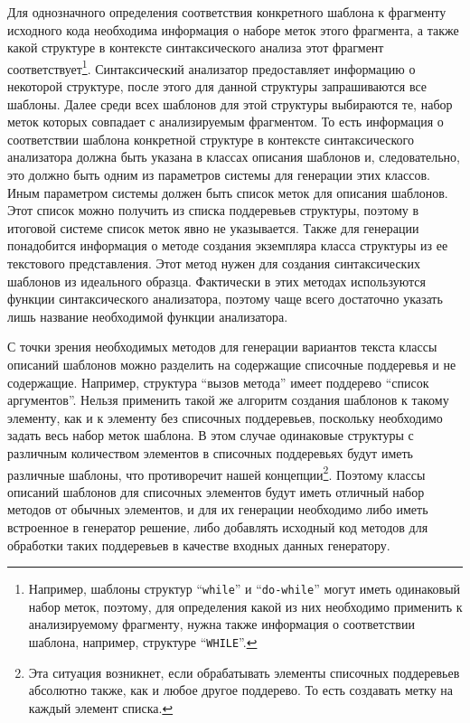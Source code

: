 Для однозначного определения соответствия конкретного шаблона к фрагменту исходного кода необходима информация о наборе меток этого фрагмента, а также какой структуре в контексте синтаксического анализа этот фрагмент соответствует\footnote{Например, шаблоны структур ``\lstinline{while}'' и ``\lstinline{do-while}'' могут иметь одинаковый набор меток, поэтому, для определения какой из них необходимо применить к анализируемому фрагменту, нужна также информация о соответствии шаблона, например, структуре ``\lstinline{WHILE}''.}. Синтаксический анализатор предоставляет информацию о некоторой структуре, после этого для данной структуры запрашиваются все шаблоны. Далее среди всех шаблонов для этой структуры выбираются те, набор меток которых совпадает с анализируемым фрагментом. То есть информация о соответствии шаблона конкретной структуре в контексте синтаксического анализатора должна быть указана в классах описания шаблонов и, следовательно, это должно быть одним из параметров системы для генерации этих классов. Иным параметром системы должен быть список меток для описания шаблонов. Этот список можно получить из списка поддеревьев структуры, поэтому в итоговой системе список меток явно не указывается. Также для генерации понадобится информация о методе создания экземпляра класса структуры из ее текстового представления. Этот метод нужен для создания синтаксических шаблонов из идеального образца. Фактически в этих методах используются функции синтаксического анализатора, поэтому чаще всего достаточно указать лишь название необходимой функции анализатора. 

С точки зрения необходимых методов для генерации вариантов текста классы описаний шаблонов можно разделить на содержащие списочные поддеревья и не содержащие. Например, структура ``вызов метода'' имеет поддерево ``список аргументов''. Нельзя применить такой же алгоритм создания шаблонов к такому элементу, как и к элементу без списочных поддеревьев, поскольку необходимо задать весь набор меток шаблона. В этом случае одинаковые структуры с различным количеством элементов в списочных поддеревьях будут иметь различные шаблоны, что противоречит нашей концепции\footnote{Эта ситуация возникнет, если обрабатывать элементы списочных поддеревьев абсолютно также, как и любое другое поддерево. То есть создавать метку на каждый элемент списка.}. Поэтому классы описаний шаблонов для списочных элементов будут иметь отличный набор методов от обычных элементов, и для их генерации необходимо либо иметь встроенное в генератор решение, либо добавлять исходный код методов для обработки таких поддеревьев в качестве входных данных генератору. 

